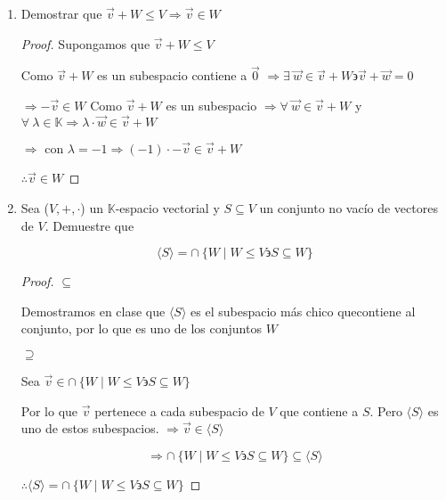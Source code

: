 \documentclass[12pt]{article}
\newcommand\K{\ensuremath{\mathbb{K}}}
\begin{document}
\begin{enumerate}
\begin{proof}
    \begin{equation*}
        \Rightarrow (\vec{v} + \vec{w}) + (-\vec{w} )  \in W_2
    \end{equation*}
    \begin{equation*}
        \Rightarrow \vec{v} \in W_2
    \end{equation*}

    $\therefore $ como $\vec{v}$ arbitrario $W_1 \subseteq W_2$

    Sin perdida de generalidad, la prueba para $W_2 \subseteq W_1$ es análoga. Cuando $W_2 = W_1$  la demostración es trivial.
\end{proof}

\item Demostrar que $\vec{v}+W \leq V \Rightarrow \vec{v} \in W$

\begin{proof}
    Supongamos que $\vec{v}+W \leq V$

    Como $\vec{v}+W$ es un subespacio contiene a $\vec{0}$ $\Rightarrow \exists  \: \vec{w} \in \vec{v}+W   \backepsilon \vec{v} + \vec{w} = 0$

    $\Rightarrow - \vec{v} \in W$ Como $\vec{v}+W$ es un subespacio $\Rightarrow \forall \: \vec{w} \in \vec{v}+W$ y $\forall \: \lambda \in \K \Rightarrow \lambda \cdot \vec{w} \in \vec{v}+W$

    $\Rightarrow$ con $\lambda = -1 \Rightarrow (-1) \cdot -\vec{v} \in \vec{v} + W$

    $\therefore \vec{v} \in W$
\end{proof}

\item Sea ($V,+,\cdot$) un $\K$-espacio vectorial y $S \subseteq V$ un conjunto no vacío de vectores de $V$. Demuestre que

\begin{equation*}
    \langle S \rangle = \cap \: \{ W \mid W \leq V \backepsilon S \subseteq W \}
\end{equation*}

\begin{proof}

    $\subseteq$

    Demostramos en clase que  $\langle S \rangle$ es el subespacio más chico quecontiene al conjunto, por lo que es uno de los conjuntos $W$

    $\supseteq$
    
    Sea $\vec{v} \in \cap \: \{ W \mid W \leq V \backepsilon S \subseteq W \}$

    Por lo que $\vec{v} $ pertenece a cada subespacio de $V$ que contiene a $S$. Pero $\langle S \rangle$ es uno de estos subespacios. $\Rightarrow \vec{v} \in  \langle S \rangle $

    $$\Rightarrow \cap \: \{ W \mid W \leq V \backepsilon S \subseteq W \} \subseteq \langle S \rangle$$

    $\therefore \langle S \rangle = \cap \: \{ W \mid W \leq V \backepsilon S \subseteq W \}$ 

\end{proof}


\end{enumerate}
\end{document}
